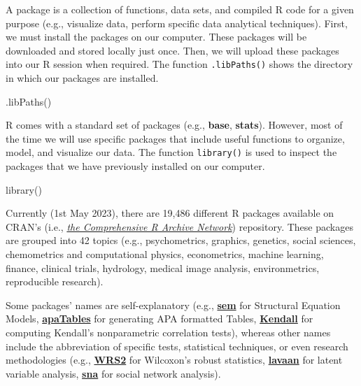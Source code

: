 \documentclass[
]{book}
\newenvironment{Shaded}{\begin{snugshade}}{\end{snugshade}}
\newcommand{\FunctionTok}[1]{\textcolor[rgb]{0.00,0.00,0.00}{#1}}
\newcommand{\NormalTok}[1]{#1}
\theoremstyle{definition}
\theoremstyle{definition}
\theoremstyle{definition}
\theoremstyle{definition}
\theoremstyle{remark}
\begin{document}
A package is a collection of functions, data sets, and compiled R code for a given purpose (e.g., visualize data, perform specific data analytical techniques). First, we must install the packages on our computer. These packages will be downloaded and stored locally just once. Then, we will upload these packages into our R session when required. The function \texttt{.libPaths()} shows the directory in which our packages are installed.

\begin{Shaded}
\begin{Highlighting}[]

\FunctionTok{.libPaths}\NormalTok{()}
\end{Highlighting}
\end{Shaded}

R comes with a standard set of packages (e.g., \textbf{base}, \textbf{stats}). However, most of the time we will use specific packages that include useful functions to organize, model, and visualize our data. The function \texttt{library()} is used to inspect the packages that we have previously installed on our computer.

\begin{Shaded}
\begin{Highlighting}[]

\FunctionTok{library}\NormalTok{()}
\end{Highlighting}
\end{Shaded}

Currently (1st May 2023), there are 19,486 different R packages available on CRAN's (i.e., \href{http://cran.r-project.org/web/views/}{\emph{the Comprehensive R Archive Network}}) repository. These packages are grouped into 42 topics (e.g., psychometrics, graphics, genetics, social sciences, chemometrics and computational physics, econometrics, machine learning, finance, clinical trials, hydrology, medical image analysis, environmetrics, reproducible research).

Some packages' names are self-explanatory (e.g., \href{https://cran.r-project.org/web/packages/sem/sem.pdf}{\textbf{sem}} for Structural Equation Models, \href{https://dstanley4.github.io/apaTables/articles/apaTables.html}{\textbf{apaTables}} for generating APA formatted Tables, \href{https://cran.r-project.org/web/packages/Kendall/Kendall.pdf}{\textbf{Kendall}} for computing Kendall's nonparametric correlation tests), whereas other names include the abbreviation of specific tests, statistical techniques, or even research methodologies (e.g., \href{https://cran.r-project.org/web/packages/WRS2/WRS2.pdf}{\textbf{WRS2}} for Wilcoxon's robust statistics, \href{https://lavaan.ugent.be}{\textbf{lavaan}} for latent variable analysis, \href{https://statnet.org}{\textbf{sna}} for social network analysis).
\end{document}
